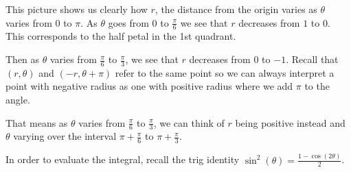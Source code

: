 \documentclass{ximera}
\begin{document}
\begin{exercise}
\begin{hint}
This picture shows us clearly how $r$, the distance from the origin varies as $\theta$ varies from $0$ to $\pi$. As $\theta$ goes from $0$ to $\frac{\pi}{6}$ we see that $r$ decreases from $1$ to $0$. This corresponds to the half petal in the 1st quadrant.

 Then as $\theta$ varies from $\frac{\pi}{6}$ to $\frac{\pi}{3}$, we see that $r$ decreases from $0$ to $-1$. Recall that $(r, \theta)$ and $(-r, \theta + \pi)$ refer to the same point so we can always interpret a point with negative radius as one with positive radius where we add $\pi$ to the angle. 

That means as $\theta$ varies from $\frac{\pi}{6}$ to $\frac{\pi}{3}$, we can think of $r$ being positive instead and $\theta$ varying over the interval $\pi + \frac{\pi}{6}$ to $\pi + \frac{\pi}{3}$. 


In order to evaluate the integral, recall the trig identity $\sin^2(\theta)=\frac{1-\cos(2\theta)}{2}$. 










\end{hint}

\end{exercise}
\end{document}
